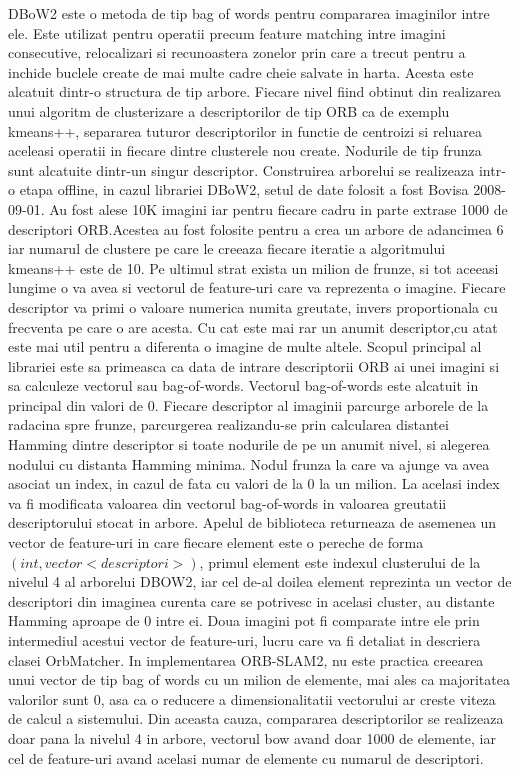 \documentclass[12pt,a4paper]{report}
\begin{document}
DBoW2 este o metoda de tip bag of words pentru compararea imaginilor intre ele. Este utilizat
pentru operatii precum feature matching intre imagini consecutive, relocalizari si recunoastera
zonelor prin care a trecut pentru a inchide buclele create de mai multe cadre cheie salvate
in harta. Acesta este alcatuit dintr-o structura de tip arbore. Fiecare nivel fiind obtinut
din realizarea unui algoritm de clusterizare a descriptorilor de tip ORB ca de exemplu 
kmeans++, separarea tuturor descriptorilor in functie de centroizi si reluarea aceleasi
operatii in fiecare dintre clusterele nou create. Nodurile de tip frunza sunt alcatuite 
dintr-un singur descriptor. Construirea arborelui se realizeaza intr-o etapa offline, in cazul
librariei DBoW2, setul de date folosit a fost Bovisa 2008{-}09{-}01. Au fost alese 10K imagini
iar pentru fiecare cadru in parte extrase 1000 de descriptori ORB.\@ Acestea au fost folosite 
pentru a crea un arbore de adancimea 6 iar numarul de clustere pe care le creeaza fiecare 
iteratie a algoritmului kmeans++ este de 10. Pe ultimul strat exista un milion de frunze, si 
tot aceeasi lungime o va avea si vectorul de feature-uri care va reprezenta o imagine. Fiecare
descriptor va primi o valoare numerica numita greutate, invers proportionala cu frecventa pe 
care o are acesta. Cu cat este mai rar un anumit descriptor,cu atat este mai util pentru a 
diferenta o imagine de multe altele. Scopul principal al librariei este sa primeasca ca data
de intrare descriptorii ORB ai unei imagini si sa calculeze vectorul sau bag-of-words.
Vectorul bag-of-words este alcatuit in principal din valori de 0. Fiecare descriptor al 
imaginii parcurge arborele de la radacina spre frunze, parcurgerea realizandu-se prin 
calcularea distantei Hamming dintre descriptor si toate nodurile de pe un anumit nivel, 
si alegerea nodului cu distanta Hamming minima. Nodul frunza la care va ajunge va avea asociat
un index, in cazul de fata cu valori de la 0 la un milion. La acelasi index va fi modificata
valoarea din vectorul bag-of-words in valoarea greutatii descriptorului stocat in arbore.
Apelul de biblioteca returneaza de asemenea un vector de feature-uri in care fiecare element
este o pereche de forma $ (int, vector<descriptori>) $, primul element este indexul 
clusterului de la nivelul 4 al arborelui DBOW2, iar cel de-al doilea element reprezinta un 
vector de descriptori din imaginea curenta care se potrivesc in acelasi cluster, au distante 
Hamming aproape de 0 intre ei. Doua imagini pot fi comparate intre ele prin intermediul acestui 
vector de feature-uri, lucru care va fi detaliat in descriera clasei OrbMatcher.  
In implementarea ORB-SLAM2, nu este practica creearea unui vector de tip bag of words 
cu un milion de elemente, mai ales ca majoritatea valorilor sunt 0, asa ca o reducere 
a dimensionalitatii vectorului ar creste viteza de calcul a sistemului. Din aceasta cauza,
compararea descriptorilor se realizeaza doar pana la nivelul 4 in arbore, vectorul bow avand 
doar 1000 de elemente, iar cel de feature-uri avand acelasi numar de elemente cu numarul de 
descriptori. 
\end{document}
